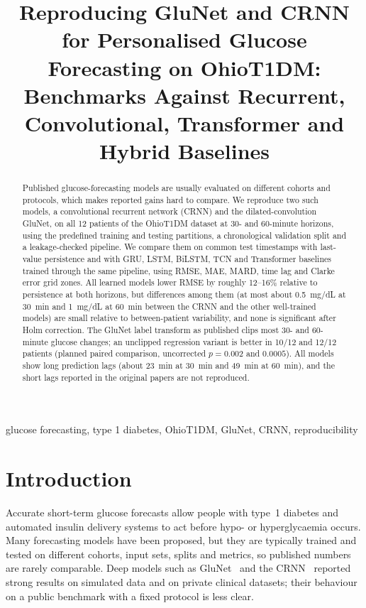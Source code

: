 \documentclass[conference]{IEEEtran}
\begin{document}
\title{Reproducing GluNet and CRNN for Personalised Glucose Forecasting on OhioT1DM: Benchmarks Against Recurrent, Convolutional, Transformer and Hybrid Baselines}
\author{}
\maketitle

\begin{abstract}
Published glucose-forecasting models are usually evaluated on different cohorts and protocols, which makes reported gains hard to compare. We reproduce two such models, a convolutional recurrent network (CRNN) and the dilated-convolution GluNet, on all 12 patients of the OhioT1DM dataset at 30- and 60-minute horizons, using the predefined training and testing partitions, a chronological validation split and a leakage-checked pipeline. We compare them on common test timestamps with last-value persistence and with GRU, LSTM, BiLSTM, TCN and Transformer baselines trained through the same pipeline, using RMSE, MAE, MARD, time lag and Clarke error grid zones. All learned models lower RMSE by roughly 12--16\% relative to persistence at both horizons, but differences among them (at most about 0.5~mg/dL at 30~min and 1~mg/dL at 60~min between the CRNN and the other well-trained models) are small relative to between-patient variability, and none is significant after Holm correction. The GluNet label transform as published clips most 30- and 60-minute glucose changes; an unclipped regression variant is better in 10/12 and 12/12 patients (planned paired comparison, uncorrected $p=0.002$ and $0.0005$). All models show long prediction lags (about 23~min at 30~min and 49~min at 60~min), and the short lags reported in the original papers are not reproduced.
\end{abstract}
\begin{IEEEkeywords}
glucose forecasting, type 1 diabetes, OhioT1DM, GluNet, CRNN, reproducibility
\end{IEEEkeywords}

\section{Introduction}
Accurate short-term glucose forecasts allow people with type~1 diabetes and automated insulin delivery systems to act before hypo- or hyperglycaemia occurs. Many forecasting models have been proposed, but they are typically trained and tested on different cohorts, input sets, splits and metrics, so published numbers are rarely comparable. Deep models such as GluNet~\cite{glunet} and the CRNN~\cite{crnn} reported strong results on simulated data and on private clinical datasets; their behaviour on a public benchmark with a fixed protocol is less clear.
\end{document}
